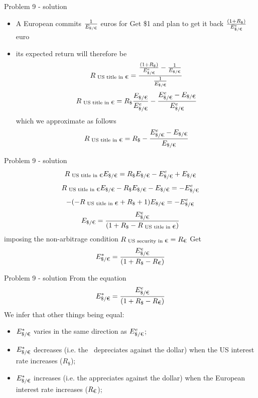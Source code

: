 \documentclass[12pt,aspectratio=169]{beamer}
\newif\ifshowsolution
\begin{document}
\ifshowsolution
\begin{frame}{Problem 9 - solution}
\begin{itemize}
\item
  A European commits \(\frac{1}{E_{\$/\textnormal{\texteuro}}}\) euros for
  Get \$1 and plan to get it back
  \(\frac{(1+R_{\textnormal{\$}})}{E^e_{\$/\textnormal{\texteuro}}}\) euro
\item
  its expected return will therefore be
  \[R_{\textnormal{ US title in \texteuro}}=\frac{\frac{(1+R_{\textnormal{\$}})}{E^e_{\$/\textnormal{\texteuro}}}-\frac{1}{E_{\$/\textnormal{\texteuro}}}}{\frac{1}{E_{\$/\textnormal{\texteuro}}}}\]
  \[R_{\textnormal{ US title in \texteuro}}=R_{\textnormal{\$}}\frac{E_{\$/\textnormal{\texteuro}}}{E^e_{\$/\textnormal{\texteuro}}}-\frac{E^e_{\$/\textnormal{\texteuro}}-E_{\$/\textnormal{\texteuro}}}{E^e_{\$/\textnormal{\texteuro}}}\]
  which we approximate as follows
  \[R_{\textnormal{ US title in \texteuro}}=R_{\textnormal{\$}}-\frac{E^e_{\$/\textnormal{\texteuro}}-E_{\$/\textnormal{\texteuro}}}{E_{\$/\textnormal{\texteuro}}}\]
\end{itemize}
\end{frame}
\begin{frame}{Problem 9 - solution}
  \[R_{\textnormal{ US title in \texteuro}}E_{\$/\textnormal{\texteuro}}=R_{\textnormal{\$}}E_{\$/\textnormal{\texteuro}}-E^e_{\$/\textnormal{\texteuro}}+E_{\$/\textnormal{\texteuro}}\]
  \[R_{\textnormal{ US title in \texteuro}}E_{\$/\textnormal{\texteuro}}-R_{\textnormal{\$}}E_{\$/\textnormal{\texteuro}}-E_{\$/\textnormal{\texteuro}}=-E^e_{\$/\textnormal{\texteuro}}\]
  \[-(-R_{\textnormal{ US title in \texteuro}}+R_{\textnormal{\$}}+1)E_{\$/\textnormal{\texteuro}}=-E^e_{\$/\textnormal{\texteuro}}\]
  \[E_{\$/\textnormal{\texteuro}}=\frac{E^e_{\$/\textnormal{\texteuro}}}{(1+R_{\textnormal{\$}}-R_{\textnormal{ US title in \texteuro}})}\]
  imposing the non-arbitrage condition $R_{\textnormal{ US security in \texteuro}}=R_{\textnormal{\texteuro}}$
Get
  \[E^*_{\$/\textnormal{\texteuro}}=\frac{E^e_{\$/\textnormal{\texteuro}}}{(1+R_{\textnormal{\$}}-R_{\textnormal{\texteuro}})}\]
\end{frame}
\begin{frame}{Problem 9 - solution}
From the equation 
  \[E^*_{\$/\textnormal{\texteuro}}=\frac{E^e_{\$/\textnormal{\texteuro}}}{(1+R_{\textnormal{\$}}-R_{\textnormal{\texteuro}})}\]
We infer that other things being equal:
\begin{itemize}
	\item $E^*_{\$/\textnormal{\texteuro}}$ varies in the same direction as $E^e_{\$/\textnormal{\texteuro}}$;
	\item $E^*_{\$/\textnormal{\texteuro}}$ decreases (i.e. the \texteuro\ depreciates against the dollar) when the US interest rate increases ($R_{\$}$);
	\item $E^*_{\$/\textnormal{\texteuro}}$ increases (i.e. the \texteuro appreciates against the dollar) when the European interest rate increases ($R_{\textnormal{\texteuro}}$);
\end{itemize}
\end{frame}
\end{document}
